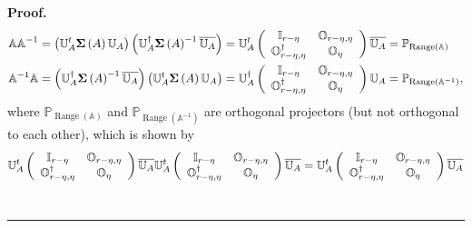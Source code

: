 \documentclass[aps,preprint]{revtex4}%
\newenvironment{proof}[1][Proof]{\noindent\textbf{#1.} }{\ \rule{0.5em}{0.5em}}
\begin{document}
\begin{proof}%
\begin{align}
\mathbb{AA}^{-1}  &  =\left(  \mathbb{U}_{A}^{t}\mathbf{\Sigma}\left(
A\right)  \mathbb{U}_{A}\right)  \left(  \mathbb{U}_{A}^{\dagger
}\mathbf{\Sigma}\left(  A\right)  ^{-1}\overline{\mathbb{U}_{A}}\right)
=\mathbb{U}_{A}^{t}\left(
\begin{array}
[c]{cc}%
\mathbb{I}_{r-\eta} & \mathbb{O}_{r-\eta,\eta}\\
\mathbb{O}_{r-\eta,\eta}^{\dagger} & \mathbb{O}_{\eta}%
\end{array}
\right)  \overline{\mathbb{U}_{A}}=\mathbb{P}_{\operatorname*{Range}\left(
\mathbb{A}\right)  }\\
\mathbb{A}^{-1}\mathbb{A}  &  =\left(  \mathbb{U}_{A}^{\dagger}\mathbf{\Sigma
}\left(  A\right)  ^{-1}\overline{\mathbb{U}_{A}}\right)  \left(
\mathbb{U}_{A}^{t}\mathbf{\Sigma}\left(  A\right)  \mathbb{U}_{A}\right)
=\mathbb{U}_{A}^{\dagger}\left(
\begin{array}
[c]{cc}%
\mathbb{I}_{r-\eta} & \mathbb{O}_{r-\eta,\eta}\\
\mathbb{O}_{r-\eta,\eta}^{\dagger} & \mathbb{O}_{\eta}%
\end{array}
\right)  \mathbb{U}_{A}=\mathbb{P}_{\operatorname*{Range}\left(
\mathbb{A}^{-1}\right)  },
\end{align}
where $\mathbb{P}_{\operatorname*{Range}\left(  \mathbb{A}\right)  }$ and
$\mathbb{P}_{\operatorname*{Range}\left(  \mathbb{A}^{-1}\right)  }$ are
orthogonal projectors (but not orthogonal to each other), which is shown by
\begin{equation}
\mathbb{U}_{A}^{t}\left(
\begin{array}
[c]{cc}%
\mathbb{I}_{r-\eta} & \mathbb{O}_{r-\eta,\eta}\\
\mathbb{O}_{r-\eta,\eta}^{\dagger} & \mathbb{O}_{\eta}%
\end{array}
\right)  \overline{\mathbb{U}_{A}}\mathbb{U}_{A}^{t}\left(
\begin{array}
[c]{cc}%
\mathbb{I}_{r-\eta} & \mathbb{O}_{r-\eta,\eta}\\
\mathbb{O}_{r-\eta,\eta}^{\dagger} & \mathbb{O}_{\eta}%
\end{array}
\right)  \overline{\mathbb{U}_{A}}=\mathbb{U}_{A}^{t}\left(
\begin{array}
[c]{cc}%
\mathbb{I}_{r-\eta} & \mathbb{O}_{r-\eta,\eta}\\
\mathbb{O}_{r-\eta,\eta}^{\dagger} & \mathbb{O}_{\eta}%
\end{array}
\right)  \overline{\mathbb{U}_{A}}%

\end{equation}
\end{proof}
\end{document}
